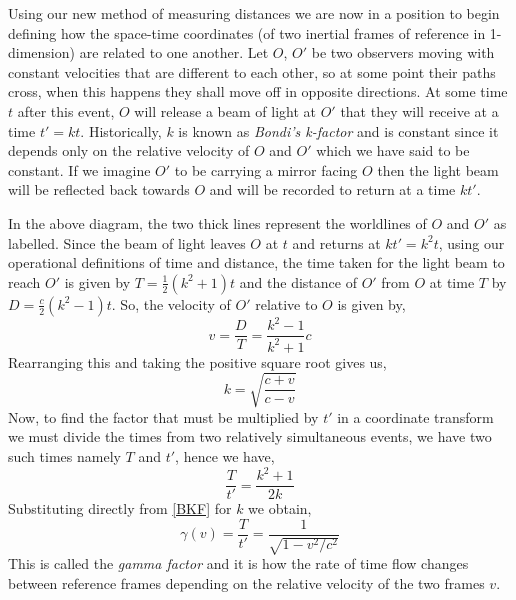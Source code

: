 \documentclass[a4paper,12pt,draft]{report}
\begin{document}
Using our new method of measuring distances we are now in a position to begin defining how the space-time coordinates (of two inertial frames of reference in 1-dimension) are related to one another. Let $O$, $O'$ be two observers moving with constant velocities that are different to each other, so at some point their paths cross, when this happens they shall move off in opposite directions. At some time $t$ after this event, $O$ will release a beam of light at $O'$ that they will receive at a time $t' = kt$. Historically, $k$ is known as \emph{Bondi's k-factor} and is constant since it depends only on the relative velocity of $O$ and $O'$ which we have said to be constant. If we imagine $O'$ to be carrying a mirror facing $O$ then the light beam will be reflected back towards $O$ and will be recorded to return at a time $kt'$.
\begin{center}
\end{center}
In the above diagram, the two thick lines represent the worldlines of $O$ and $O'$ as labelled. Since the beam of light leaves $O$ at $t$ and returns at $kt' = k^2t$, using our operational definitions of time and distance, the time taken for the light beam to reach $O'$ is given by $T = \frac{1}{2}(k^2 + 1)t$ and the distance of $O'$ from $O$ at time $T$ by $D = \frac{c}{2}(k^2 - 1)t$. So, the velocity of $O'$ relative to $O$ is given by,
$$
v = \frac{D}{T} = \frac{k^2 - 1}{k^2 + 1}c
$$
Rearranging this and taking the positive square root gives us,
\begin{equation}
k = \sqrt{\frac{c + v}{c - v}} \label{BKF}
\end{equation}
Now, to find the factor that must be multiplied by $t'$ in a coordinate transform we must divide the times from two relatively simultaneous events, we have two such times namely $T$ and $t'$, hence we have,
$$
\frac{T}{t'} = \frac{k^2 + 1}{2k}
$$
Substituting directly from \eqref{BKF} for $k$ we obtain,
\begin{equation}
\gamma(v) = \frac{T}{t'} = \frac{1}{\sqrt{1 - v^2/c^2}}
\end{equation}
This is called the \emph{gamma factor} and it is how the rate of time flow changes between reference frames depending on the relative velocity of the two frames $v$.
\end{document}
